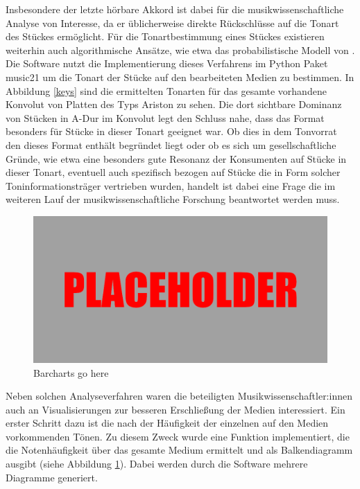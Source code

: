 Insbesondere der letzte hörbare Akkord ist dabei für die musikwissenschaftliche Analyse von Interesse, da er üblicherweise direkte Rückschlüsse auf die Tonart des Stückes ermöglicht.
Für die Tonartbestimmung eines Stückes existieren weiterhin auch algorithmische Ansätze, wie etwa das probabilistische Modell von \textcite[]{temperley_2002}.
Die  Software nutzt die Implementierung dieses Verfahrens im Python Paket music21 \parencite[]{music21} um die Tonart der Stücke auf den bearbeiteten Medien zu bestimmen.
In Abbildung \ref{keys} sind die ermittelten Tonarten für das gesamte vorhandene Konvolut von Platten des Typs Ariston zu sehen.
Die dort sichtbare Dominanz von Stücken in A-Dur im Konvolut legt den Schluss nahe, dass das Format besonders für Stücke in dieser Tonart geeignet war.
Ob dies in dem Tonvorrat den dieses Format enthält begründet liegt oder ob es sich um gesellschaftliche Gründe, wie etwa eine besonders gute Resonanz der Konsumenten auf Stücke in dieser Tonart, eventuell auch spezifisch bezogen auf Stücke die in Form solcher Toninformationsträger vertrieben wurden, handelt ist dabei eine Frage die im weiteren Lauf der musikwissenschaftliche Forschung beantwortet werden muss.

\begin{figure}[t]
    \centering
    \includegraphics[width=\textwidth]{graphics/placeholder.png}
    \caption{Barcharts go here}
    \label{barcharts}
\end{figure}

Neben solchen Analyseverfahren waren die beteiligten Musikwissenschaftler:innen auch an Visualisierungen zur besseren Erschließung der Medien interessiert.
Ein erster Schritt dazu ist die nach der Häufigkeit der einzelnen auf den Medien vorkommenden Tönen.
Zu diesem Zweck wurde eine Funktion implementiert, die die Notenhäufigkeit über das gesamte Medium ermittelt und als Balkendiagramm ausgibt (siehe Abbildung \ref{barcharts}).
Dabei werden durch die Software mehrere Diagramme generiert.

